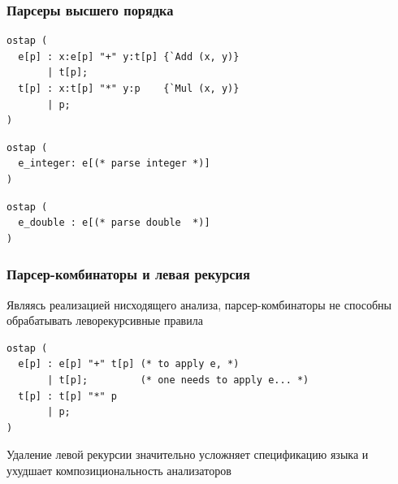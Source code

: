 \documentclass{beamer}
\begin{document}
\begin{frame}[fragile]
  \transwipe[direction=90]
  \frametitle{Парсеры высшего порядка}  
\begin{lstlisting}[frame=single]  
ostap (
  e[p] : x:e[p] "+" y:t[p] {`Add (x, y)} 
       | t[p]; 
  t[p] : x:t[p] "*" y:p    {`Mul (x, y)} 
       | p;
)
\end{lstlisting}
  
\begin{lstlisting}[frame=single]  
ostap (
  e_integer: e[(* parse integer *)]
)
\end{lstlisting}
  
\begin{lstlisting}[frame=single] 
ostap (
  e_double : e[(* parse double  *)]
)
\end{lstlisting}
\end{frame}


\begin{frame}[fragile]
  \transwipe[direction=90]
  \frametitle{Парсер-комбинаторы и левая рекурсия}  
Являясь реализацией нисходящего анализа, парсер-комбинаторы не способны обрабатывать леворекурсивные правила

\begin{lstlisting}[frame=single]  
ostap (
  e[p] : e[p] "+" t[p] (* to apply e, *)
       | t[p];         (* one needs to apply e... *)
  t[p] : t[p] "*" p    
       | p;
)
\end{lstlisting}

Удаление левой рекурсии значительно усложняет спецификацию языка и ухудшает композициональность анализаторов
\end{frame}
\end{document}

